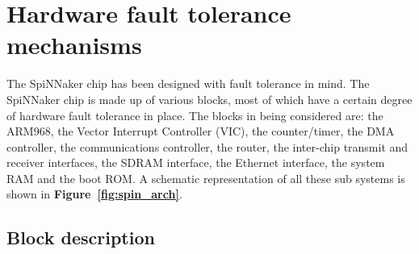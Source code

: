 \documentclass[oneside, a4paper, 11pt]{memoir}
\begin{document}
\section{Hardware fault tolerance mechanisms}
The SpiNNaker chip has been designed with fault tolerance in mind. The SpiNNaker chip is made up of various blocks, most of which have a certain degree of hardware fault tolerance in place. The blocks in being considered are: the ARM968, the Vector Interrupt Controller (VIC), the counter/timer, the DMA controller, the communications controller, the router, the inter-chip transmit and receiver interfaces, the SDRAM interface, the Ethernet interface, the system RAM and the boot ROM. A schematic representation of all these sub systems is shown in \textbf{Figure~\ref{fig:spin_arch}}.

\subsection{Block description}
\end{document}
